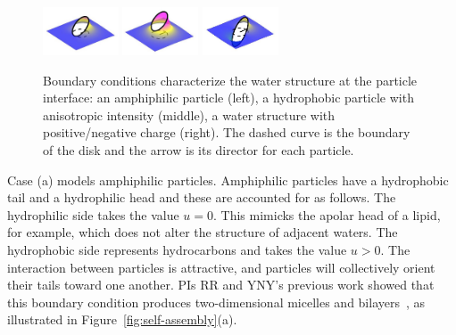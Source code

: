 \begin{figure}
  \vspace{-20pt}
  \begin{center}
  \includegraphics[width=0.2\textwidth]{figures/SpecificAim1/LPA.jpg}
  \includegraphics[width=0.2\textwidth]{figures/SpecificAim1/LPB.jpg}
  \includegraphics[width=0.2\textwidth]{figures/SpecificAim1/LPC.jpg}
  \end{center}
  \vspace{-20pt}  
  \caption{\label{fig:bcs} Boundary conditions characterize the water
    structure at the particle interface: an amphiphilic particle (left),
    a hydrophobic
  particle with anisotropic intensity (middle), a water structure with
  positive/negative charge (right). The dashed curve is the boundary of the
  disk and the arrow is its director for each particle.}
\end{figure}
Case (a) models amphiphilic particles.
Amphiphilic particles have a hydrophobic tail and a hydrophilic head
and these are accounted for as follows.
The hydrophilic side takes the value $u =0$.
This mimicks the apolar head of a lipid, for example, which does
not alter the structure of adjacent waters. The hydrophobic side
represents hydrocarbons and takes the value 
$u > 0$. The interaction between particles is attractive,
and particles will collectively orient their tails toward
one another. 
PIs RR and YNY's previous work showed that this   
boundary condition produces two-dimensional micelles and
bilayers~\cite{Fu2018_SIAM}, as illustrated in 
Figure~\ref{fig:self-assembly}(a).

